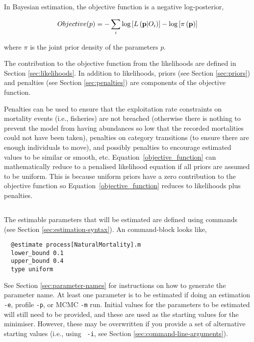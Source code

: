 In Bayesian estimation, the objective function is a negative log-posterior,

\begin{equation}\label{objective_function}
Objective(p)= - \sum\limits_i {\log \left[ {L\left( {{\bf{p}}|O_i } \right)} \right]}  - \log \left[ {\pi \left( {\bf{p}} \right)} \right]
\end{equation}

where $\pi$ is the joint prior density of the parameters $p$.

The contribution to the objective function from the likelihoods are defined in Section \ref{sec:likelihoods}. In addition to likelihoods, priors (see Section \ref{sec:priors}) and penalties (see Section \ref{sec:penalties}) are components of the objective function. 

Penalties can be used to ensure that the exploitation rate constraints on mortality events (i.e., fisheries) are not breached (otherwise there is nothing to prevent the model from having abundances so low that the recorded mortalities could not have been taken), penalties on category transitions (to ensure there are enough individuals to move), and possibly penalties to encourage estimated values to be similar or smooth, etc. Equation~\ref{objective_function} can mathematically reduce to a penalised likelihood equation if all priors are assumed to be uniform. This is because uniform priors have a zero contribution to the objective function so Equation~\ref{objective_function} reduces to likelihoods plus penalties.

\subsection{\label{sec:estimate-free-parameters}}
The estimable parameters that will be estimated are defined using  commands (see Section \ref{sec:estimation-syntax}). An  command-block looks like,

{\small{\begin{verbatim}
  @estimate process[NaturalMortality].m
  lower_bound 0.1
  upper_bound 0.4
  type uniform
\end{verbatim}}}

See Section \ref{sec:parameter-names} for instructions on how to generate the parameter name. At least one parameter is to be estimated if doing an estimation \texttt{-e}, profile \texttt{-p}, or MCMC \texttt{-m} run. Initial values for the parameters to be estimated will still need to be provided, and these are used as the starting values for the minimiser. However, these may be overwritten if you provide a set of alternative starting values (i.e., using  \texttt{\cname\ -i}, see Section \ref{sec:command-line-arguments}).

